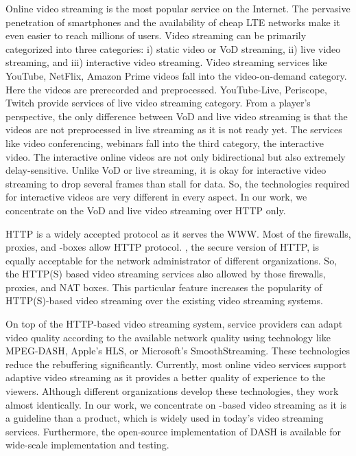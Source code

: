 Online video streaming is the most popular service on the Internet. The pervasive penetration of smartphones and the availability of cheap \ac{LTE} networks make it even easier to reach millions of users. Video streaming can be primarily categorized into three categories: i) static video or \ac{VoD} streaming, ii) live video streaming, and iii) interactive video streaming. Video streaming services like YouTube, NetFlix, Amazon Prime videos fall into the video-on-demand category. Here the videos are prerecorded and preprocessed. YouTube-Live, Periscope, Twitch provide services of live video streaming category. From a player's perspective, the only difference between \ac{VoD} and live video streaming is that the videos are not preprocessed in live streaming as it is not ready yet. The services like video conferencing, webinars fall into the third category, the interactive video. The interactive online videos are not only bidirectional but also extremely delay-sensitive. Unlike \ac{VoD} or live streaming, it is okay for interactive video streaming to drop several frames than stall for data. So, the technologies required for interactive videos are very different in every aspect. In our work, we concentrate on the \ac{VoD} and live video streaming over HTTP only.

\ac{HTTP} is a widely accepted protocol as it serves the \ac{WWW}. Most of the firewalls, proxies, and -boxes allow \ac{HTTP} protocol. , the secure version of \ac{HTTP}, is equally acceptable for the network administrator of different organizations. So, the HTTP(S) based video streaming services also allowed by those firewalls, proxies, and \ac{NAT} boxes. This particular feature increases the popularity of \ac{HTTP(S)}-based video streaming over the existing video streaming systems.

On top of the \ac{HTTP}-based video streaming system, service providers can adapt video quality according to the available network quality using technology like MPEG-DASH, Apple's \ac{HLS}, or Microsoft's SmoothStreaming. These technologies reduce the rebuffering significantly. Currently, most online video services support adaptive video streaming as it provides a better quality of experience to the viewers. Although different organizations develop these technologies, they work almost identically. In our work, we concentrate on -based video streaming as it is a guideline than a product, which is widely used in today's video streaming services. Furthermore, the open-source implementation of \ac{DASH} is available for wide-scale implementation and testing.


